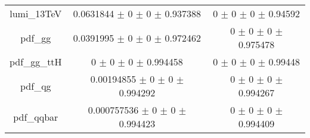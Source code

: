 \begin{table}
\begin{tabular}{ccc}
lumi\_13TeV & \num{0.0631844} $\pm$ \num{0} $\pm$ \num{0} $\pm$ \num{0.937388} & \num{0} $\pm$ \num{0} $\pm$ \num{0} $\pm$ \num{0.94592}\\
pdf\_gg & \num{0.0391995} $\pm$ \num{0} $\pm$ \num{0} $\pm$ \num{0.972462} & \num{0} $\pm$ \num{0} $\pm$ \num{0} $\pm$ \num{0.975478}\\
pdf\_gg\_ttH & \num{0} $\pm$ \num{0} $\pm$ \num{0} $\pm$ \num{0.994458} & \num{0} $\pm$ \num{0} $\pm$ \num{0} $\pm$ \num{0.99448}\\
pdf\_qg & \num{0.00194855} $\pm$ \num{0} $\pm$ \num{0} $\pm$ \num{0.994292} & \num{0} $\pm$ \num{0} $\pm$ \num{0} $\pm$ \num{0.994267}\\
pdf\_qqbar & \num{0.000757536} $\pm$ \num{0} $\pm$ \num{0} $\pm$ \num{0.994423} & \num{0} $\pm$ \num{0} $\pm$ \num{0} $\pm$ \num{0.994409}\\
\bottomrule
\end{tabular}
\end{table}